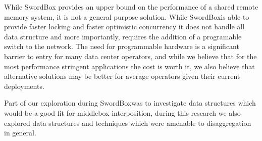 \documentclass[12pt]{ucsddissertation}
\newcommand{\sword}{SwordBox}
\begin{document}
While {\sword} provides an  upper bound on the performance of a
shared remote memory system, it is not a general purpose solution. While \sword is able to provide
faster locking and faster optimistic concurrency it does not handle all data structure and more
importantly, requires the addition of a programable switch to the network. The need for programmable
hardware is a significant barrier to entry for many data center operators, and while we believe that
for the most performance stringent applications the cost is worth it, we also believe that
alternative solutions may be better for average operators given their current deployments. 

Part of
our exploration during \sword was to investigate data structures which would be a good fit for
middlebox interposition, during this research we also explored data structures and techniques which
were amenable to disaggregation in general.
\end{document}
